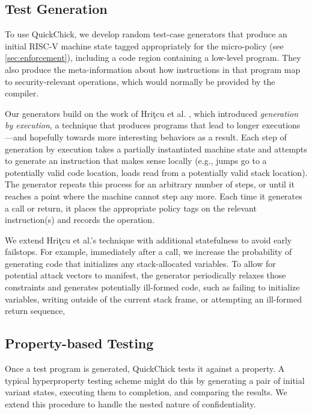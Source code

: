 \documentclass[10pt,conference]{ieeetran}%
\theoremstyle{definition}
\begin{document}
\subsection{Test Generation}

To use QuickChick, we develop random test-case generators that produce
an initial RISC-V machine state tagged appropriately for the micro-policy
(see \cref{sec:enforcement}), including a code region containing a
low-level program. They also produce the meta-information about
how instructions in that program map to security-relevant operations,
which would normally be provided by the compiler.

Our generators build on the work of Hri\c{t}cu et
al. \cite{TestingNI:ICFP, DBLP:journals/jfp/HritcuLSADHPV16}, which
introduced {\em generation by execution}, a technique that produces
programs that lead to longer executions---and hopefully towards more
interesting behaviors as a result.
%
Each step of generation by execution takes a partially instantiated
machine state and attempts to generate an instruction
that makes sense locally (e.g., jumps go
to a potentially valid code location, loads read from a
potentially valid stack location). The generator repeats this process
for an arbitrary number of steps, or until it reaches a point where
the machine cannot step any more. Each time it generates a call or return,
it places the appropriate policy tags on the relevant instruction(s)
and records the operation.

We extend Hri\c{t}cu et al.'s technique with additional statefulness
to avoid early failstops. For example, immediately after a call, we
increase the probability of generating code that initializes any stack-allocated variables.
To allow for potential attack vectors to manifest,
the generator periodically relaxes those constraints and generates potentially ill-formed
code, such as failing to initialize variables, writing outside
of the current stack frame, or attempting an ill-formed return sequence,

\subsection{Property-based Testing}

Once a test program is generated, QuickChick tests it against a
property. A typical hyperproperty testing scheme might do this by
generating a pair of initial variant states, executing them to completion,
and comparing the results. We extend this procedure to handle the nested
nature of confidentiality.
\end{document}
